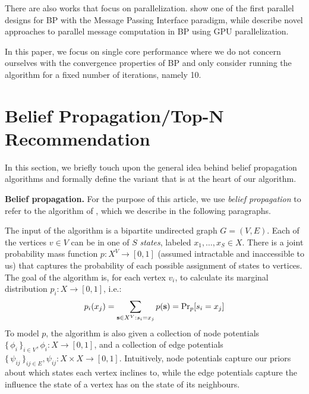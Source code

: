 \documentclass[letterpaper]{article}
\newcommand{\mypar}[1]{{\bf #1.}}
\begin{document}
There are also works that focus on parallelization. \citet{related2} show one of the first parallel designs for BP with the Message Passing Interface paradigm, while \citet{related3} describe novel approaches to parallel message computation in BP using GPU parallelization.

In this paper, we focus on single core performance where we do not concern ourselves with the convergence properties of BP and only consider running the algorithm for a fixed number of iterations, namely 10.

\section{Belief Propagation/Top-N Recommendation}\label{sec:background}

In this section, we briefly touch upon the general idea behind belief
propagation algorithms and formally define the variant that is at the heart of
our algorithm.


\mypar{Belief propagation} For the purpose of this article, we use \emph{belief
propagation} to refer to the algorithm of \citet[Section
2.1]{top-n-recommendation}, which we describe in the following paragraphs.

The input of the algorithm is a bipartite undirected graph $G = (V, E)$. Each of the vertices $v\in V$ can
be in one of $S$ \emph{states}, labeled $x_1, \ldots, x_S \in X$. There is a
joint probability mass function $p: X^V \to [0, 1]$ (assumed intractable and
inaccessible to us) that captures the probability of each possible assignment of
states to vertices. The goal of the algorithm is, for each vertex $v_i$, to
calculate its marginal distribution $p_i: X \to [0, 1]$, i.e.:
%
$$p_i(x_j) = \sum_{\ves \in X^V: s_i = x_j} p(\ves) = \Pr_p[s_i = x_j]$$
%
To model $p$, the algorithm is also given a collection of node potentials
$\{\,\phi_i\,\}_{i \in V}, \phi_i: X \to [0, 1]$, and a collection of edge
potentials $\{\,\psi_{ij}\,\}_{ij \in E}, \psi_{ij}: X\times X \to [0, 1]$.
Intuitively, node potentials capture our priors about which states each vertex
inclines to, while the edge potentials capture the influence the state of a
vertex has on the state of its neighbours.
\end{document}
